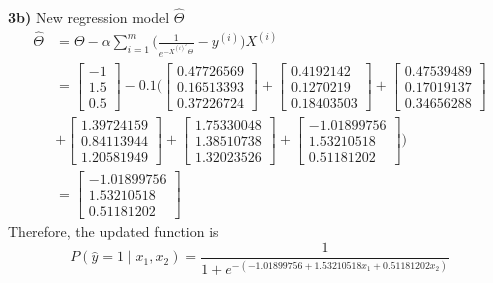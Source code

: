 \documentclass[12pt]{article}
\begin{document}
\paragraph{\\}
\textbf{3b)}
New regression model $\hat{\Theta}$
\begin{align*}
\hat{\Theta} &= \Theta - \alpha \sum_{i=1}^{m}\Bigg(\frac{1}{e^{-X^{(i)^{T}}\Theta}} - y^{(i)}\Bigg)X^{(i)}\\
&= \begin{bmatrix}
-1\\1.5\\0.5
\end{bmatrix} - 0.1\Bigg( \begin{bmatrix}
0.47726569\\0.16513393\\0.37226724
\end{bmatrix} +
\begin{bmatrix}
0.4192142\\0.1270219\\0.18403503
\end{bmatrix} +
\begin{bmatrix}
0.47539489\\0.17019137\\0.34656288
\end{bmatrix} \\&+
\begin{bmatrix}
1.39724159\\0.84113944\\1.20581949
\end{bmatrix} +
\begin{bmatrix}
1.75330048\\1.38510738\\1.32023526
\end{bmatrix} +
\begin{bmatrix}
-1.01899756\\1.53210518\\0.51181202
\end{bmatrix}\Bigg)\\
&= \begin{bmatrix}
-1.01899756\\1.53210518\\0.51181202
\end{bmatrix}
\end{align*}
Therefore, the updated function is \[ P(\hat{y} = 1\mid x_{1}, x_{2}) = \frac{1}{1+e^{-(-1.01899756+1.53210518x_{1}+0.51181202x_{2})}}\]
\end{document}
